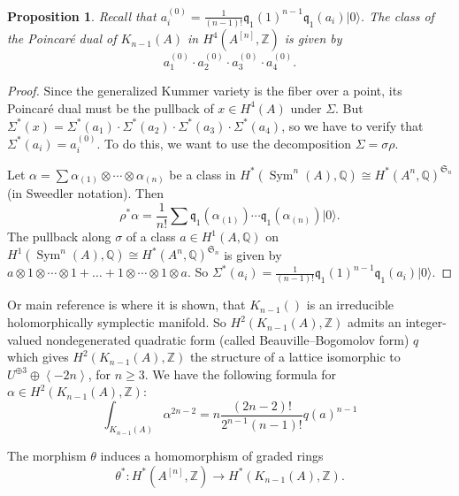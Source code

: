 \documentclass{amsart}
\DeclareMathOperator{\Sym}{Sym}
\newcommand{\hilb}[1]{^{[#1]}}
\newcommand{\vac}{|0\rangle}
\newcommand{\q}{\mathfrak{q}}
\newcommand{\pone}{ \mathfrak{p}_{ - 1} }
\newcommand{\kum}[2]{K_{ #2 }( #1 )}
\newcommand{\Q}{\mathbb{Q}}
\newcommand{\Z}{\mathbb{Z}}
\newcommand{\kq}{\mathfrak{q}}
\theoremstyle{plain}
\newtheorem{proposition}[theorem]{Proposition}
\theoremstyle{definition}
\theoremstyle{remark}
\begin{document}
\begin{proposition}
Recall that $a_i^{(0)}= \frac{1}{(n-1)!}\kq_{1}(1)^{n-1}\kq_1(a_i)\vac$. The class of the Poincar\'e dual of $\kum{A}{n-1}$ in $H^4(A\hilb{n},\Z)$ is given by
$$
a_1^{(0)}\cdot a_2^{(0)}\cdot a_3^{(0)}\cdot a_4^{(0)}.
$$ 
\end{proposition}
\begin{proof}
Since the generalized Kummer variety is the fiber over a point, its Poincar\'e dual must be the pullback of $x\in H^4(A)$ under $\Sigma$. But $\Sigma^* (x) = \Sigma^*(a_1)\cdot \Sigma^*(a_2)\cdot \Sigma^*(a_3)\cdot \Sigma^*(a_4)$, so we have to verify that $\Sigma^* (a_i) = a_i^{(0)}$. To do this, we want to use the decomposition $\Sigma = \sigma\rho$.

Let $\alpha = \sum \alpha_{(1)} \otimes\cdots\otimes \alpha_{(n)} $ be a class in $H^*(\Sym^n(A),\Q) \cong H^*(A^n,\Q)^{\mathfrak{S}_n}$ (in Sweedler notation). Then 
$$
\rho^ * \alpha = \frac{1}{n!} \sum \q_1( \alpha_{(1)} )\cdots\q_1( \alpha_{(n)} ) \vac.
$$
The pullback along $\sigma$ of a class $a\in H^1(A,\Q)$ on $H^1(\Sym^n(A),\Q) \cong H^*(A^n,\Q)^{\mathfrak{S}_n}$ is given by $a\otimes 1\otimes \cdots\otimes 1 + \ldots + 1\otimes \cdots\otimes 1\otimes a$. So $\Sigma^* (a_i) = \frac{1}{(n-1)!}\kq_{1}(1)^{n-1}\kq_1(a_i)\vac $.
\end{proof}

Or main reference is \cite{Beauville} where it is shown, that $\kum{}{n-1}$ is an irreducible holomorphically symplectic manifold. So $H^2(\kum{A}{n-1},\Z)$ admits an integer-valued nondegenerated quadratic form (called Beauville--Bogomolov form) $q$ which gives $H^2(\kum{A}{n-1},\Z)$ the structure of a lattice isomorphic to $U^{\oplus 3}\oplus \left< -2n \right>$, for $n\geq 3$. We have the following formula for $\alpha\in H^2(\kum{A}{n-1},\Z)$:
\begin{equation} \label{fujiki}
\int_{\kum{A}{n-1}} \alpha^{2n-2} = n\frac{(2n-2)!}{2^{n-1}(n-1)!} q(a)^{n-1}
\end{equation}


The morphism $\theta$ induces a homomorphism of graded rings
\begin{equation}
\theta^* :H^*(A\hilb{n},\Z)\longrightarrow H^*(\kum{A}{n-1},\Z).
\end{equation}
\end{document}
